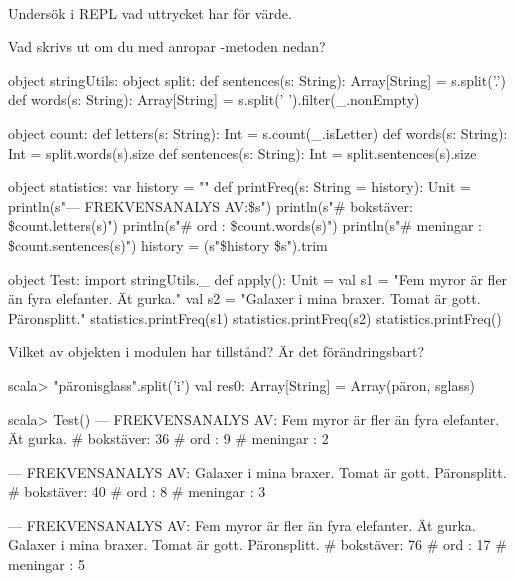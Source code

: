 
\QUESTBEGIN

\Task  \what~

\Subtask Undersök i REPL vad uttrycket  har för värde.

\Subtask Vad skrivs ut om du med  anropar -metoden nedan?
\begin{CodeSmall}
object stringUtils:
  object split:
    def sentences(s: String): Array[String] = s.split('.')
    def words(s: String): Array[String] = s.split(' ').filter(_.nonEmpty)

  object count:
    def letters(s: String):   Int = s.count(_.isLetter)
    def words(s: String):     Int = split.words(s).size
    def sentences(s: String): Int = split.sentences(s).size

  object statistics:
    var history = ""
    def printFreq(s: String = history): Unit =
      println(s"\n--- FREKVENSANALYS AV:\n\$s")
      println(s"# bokstäver: \${count.letters(s)}")
      println(s"# ord      : \${count.words(s)}")
      println(s"# meningar : \${count.sentences(s)}")
      history = (s"\$history \$s").trim

object Test:
  import stringUtils._
  def apply(): Unit =
    val s1 = "Fem     myror är fler än fyra elefanter. Ät gurka."
    val s2 = "Galaxer i mina braxer. Tomat är gott. Päronsplitt."
    statistics.printFreq(s1)
    statistics.printFreq(s2)
    statistics.printFreq()
\end{CodeSmall}

\Subtask Vilket av objekten i modulen  har tillstånd? Är det förändringsbart?


\SOLUTION


\TaskSolved \what

\SubtaskSolved
\begin{REPLnonum}
scala> "päronisglass".split('i')
val res0: Array[String] = Array(päron, sglass)
\end{REPLnonum}

\SubtaskSolved
\begin{REPLnonum}
scala> Test()
--- FREKVENSANALYS AV:
Fem     myror är fler än fyra elefanter. Ät gurka.
# bokstäver: 36
# ord      : 9
# meningar : 2

--- FREKVENSANALYS AV:
Galaxer i mina braxer. Tomat är gott. Päronsplitt.
# bokstäver: 40
# ord      : 8
# meningar : 3

--- FREKVENSANALYS AV:
Fem     myror är fler än fyra elefanter. Ät gurka. Galaxer i mina braxer. Tomat
är gott. Päronsplitt.
# bokstäver: 76
# ord      : 17
# meningar : 5
\end{REPLnonum}

